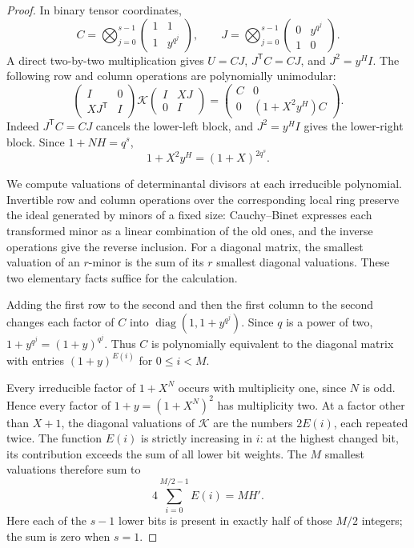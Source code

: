 \begin{proof}
In binary tensor coordinates,
\[
 C=\bigotimes_{j=0}^{s-1}
       \begin{pmatrix}1&1\\1&y^{q^j}\end{pmatrix},\qquad
 J=\bigotimes_{j=0}^{s-1}
       \begin{pmatrix}0&y^{q^j}\\1&0\end{pmatrix}.
\]
A direct two-by-two multiplication gives $U=CJ$,
$J^{\mathsf T}C=CJ$, and $J^2=y^H I$.
The following row and column operations are polynomially unimodular:
\begin{equation}\label{eq:digit-kernel-congruence}
 \begin{pmatrix}I&0\\XJ^{\mathsf T}&I\end{pmatrix}
 \mathcal K
 \begin{pmatrix}I&XJ\\0&I\end{pmatrix}
 =\begin{pmatrix}C&0\\0&(1+X^2y^H)C\end{pmatrix}.
\end{equation}
Indeed $J^{\mathsf T}C=CJ$ cancels the lower-left block, and
$J^2=y^H I$ gives the lower-right block. Since $1+NH=q^s$,
\[
 1+X^2y^H=(1+X)^{2q^s}.
\]

We compute valuations of determinantal divisors at each irreducible
polynomial. Invertible row and column operations over the corresponding
local ring preserve the ideal generated by minors of a fixed size:
Cauchy--Binet expresses each transformed minor as a linear combination
of the old ones, and the inverse operations give the reverse inclusion.
For a diagonal matrix, the smallest valuation of an $r$-minor is the
sum of its $r$ smallest diagonal valuations. These two elementary facts
suffice for the calculation.

Adding the first row to the second and then the first column to the
second changes each factor of $C$ into
$\operatorname{diag}(1,1+y^{q^j})$.
Since $q$ is a power of two, $1+y^{q^j}=(1+y)^{q^j}$.
Thus $C$ is polynomially equivalent to the diagonal matrix with entries
$(1+y)^{E(i)}$ for $0\leq i<M$.

Every irreducible factor of $1+X^N$ occurs with multiplicity one,
since $N$ is odd. Hence every factor of $1+y=(1+X^N)^2$ has
multiplicity two. At a factor other than $X+1$, the diagonal valuations
of $\mathcal K$ are the numbers $2E(i)$, each repeated twice.
The function $E(i)$ is strictly increasing in $i$: at the highest
changed bit, its contribution exceeds the sum of all lower bit weights.
The $M$ smallest valuations therefore sum to
\[
 4\sum_{i=0}^{M/2-1}E(i)=MH'.
\]
Here each of the $s-1$ lower bits is present in exactly half of those
$M/2$ integers; the sum is zero when $s=1$.


\end{proof}
